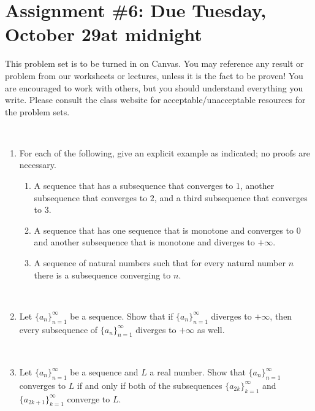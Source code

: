\documentclass[12pt]{amsart}
\newcommand{\showsol}[1]{\def\displaysol{#1}}
\begin{document}
\showsol{1}
	
	\thispagestyle{empty}
	
	\section*{Assignment \#6: Due Tuesday, October 29at midnight}
	
	This problem set is to be turned in on Canvas. You may reference any result or problem from our worksheets or lectures, unless it is the fact to be proven! You are encouraged to work with others, but you should understand everything you write. Please consult the class website for acceptable/unacceptable resources for the problem sets.
	
	\
	
	

\begin{enumerate}

\item For each of the following, give an explicit example as indicated; no proofs are necessary.
\begin{enumerate}
\item A sequence that has a subsequence that converges to $1$, another subsequence that converges to $2$, and a third subsequence that converges to $3$. 
\item A sequence that has one sequence that is monotone and converges to $0$ and another subsequence that is monotone and diverges to $+\infty$.
\item A sequence of natural numbers such that for every natural number $n$ there is a subsequence converging to $n$. 
\end{enumerate}


\

\item Let $\{a_n\}_{n=1}^\infty$ be a sequence. Show that if $\{a_n\}_{n=1}^\infty$ diverges to $+\infty$, then every subsequence of $\{a_n\}_{n=1}^\infty$ diverges to $+\infty$ as well.

\


\item Let $\{a_n\}_{n=1}^\infty$ be a sequence and $L$ a real number. Show that $\{a_n\}_{n=1}^\infty$ converges to $L$ if and only if both of the subsequences $\{a_{2k}\}_{k=1}^\infty$ and $\{a_{2k+1}\}_{k=1}^\infty$ converge to $L$.

\end{enumerate}

\

\noindent \hrulefill
\end{document}
